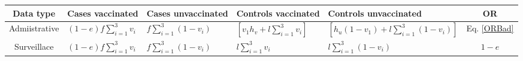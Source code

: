 \begin{tabular}{cp{5em}p{7em}p{5em}p{8em}c}
\toprule
Data type & Cases vaccinated & Cases unvaccinated & Controls vaccinated & Controls unvaccinated & OR \\
\midrule
Admiistrative & $(1-e)f \sum_{i=1}^3 v_i$ & $f \sum_{i=1}^3 (1-v_i)$ & $[v_1h_v+l \sum_{i=1}^3 v_i]$ & $[h_u(1-v_1) + l\sum_{i=1}^3(1-v_i)]$ & Eq. \ref{ORBad} \\
Surveillace & $(1-e)f \sum_{i=1}^3 v_i$ & $f \sum_{i=1}^3 (1-v_i)$ & $l \sum_{i=1}^3 v_i$ & $l\sum_{i=1}^3(1-v_i)$ & $1-e$ \\
\bottomrule
\end{tabular}